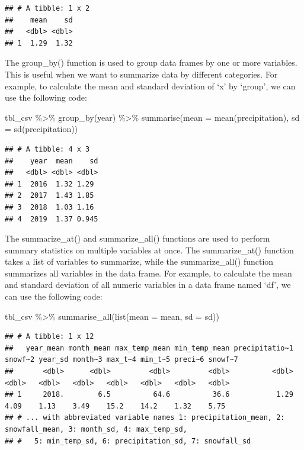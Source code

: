\documentclass[
]{book}
\newenvironment{Shaded}{\begin{snugshade}}{\end{snugshade}}
\newcommand{\AttributeTok}[1]{\textcolor[rgb]{0.77,0.63,0.00}{#1}}
\newcommand{\FunctionTok}[1]{\textcolor[rgb]{0.00,0.00,0.00}{#1}}
\newcommand{\NormalTok}[1]{#1}
\newcommand{\SpecialCharTok}[1]{\textcolor[rgb]{0.00,0.00,0.00}{#1}}
\begin{document}
\begin{verbatim}
## # A tibble: 1 x 2
##    mean    sd
##   <dbl> <dbl>
## 1  1.29  1.32
\end{verbatim}

The group\_by() function is used to group data frames by one or more variables. This is useful when we want to summarize data by different categories. For example, to calculate the mean and standard deviation of `x' by `group', we can use the following code:

\begin{Shaded}
\begin{Highlighting}[]
\NormalTok{tbl\_csv }\SpecialCharTok{\%\textgreater{}\%}
  \FunctionTok{group\_by}\NormalTok{(year) }\SpecialCharTok{\%\textgreater{}\%}
  \FunctionTok{summarise}\NormalTok{(}\AttributeTok{mean =} \FunctionTok{mean}\NormalTok{(precipitation), }
            \AttributeTok{sd =} \FunctionTok{sd}\NormalTok{(precipitation))}
\end{Highlighting}
\end{Shaded}

\begin{verbatim}
## # A tibble: 4 x 3
##    year  mean    sd
##   <dbl> <dbl> <dbl>
## 1  2016  1.32 1.29 
## 2  2017  1.43 1.85 
## 3  2018  1.03 1.16 
## 4  2019  1.37 0.945
\end{verbatim}

The summarize\_at() and summarize\_all() functions are used to perform summary statistics on multiple variables at once. The summarize\_at() function takes a list of variables to summarize, while the summarize\_all() function summarizes all variables in the data frame. For example, to calculate the mean and standard deviation of all numeric variables in a data frame named `df', we can use the following code:

\begin{Shaded}
\begin{Highlighting}[]
\NormalTok{tbl\_csv }\SpecialCharTok{\%\textgreater{}\%}
  \FunctionTok{summarise\_all}\NormalTok{(}\FunctionTok{list}\NormalTok{(}\AttributeTok{mean =}\NormalTok{ mean, }\AttributeTok{sd =}\NormalTok{ sd))}
\end{Highlighting}
\end{Shaded}

\begin{verbatim}
## # A tibble: 1 x 12
##   year_mean month_mean max_temp_mean min_temp_mean precipitatio~1 snowf~2 year_sd month~3 max_t~4 min_t~5 preci~6 snowf~7
##       <dbl>      <dbl>         <dbl>         <dbl>          <dbl>   <dbl>   <dbl>   <dbl>   <dbl>   <dbl>   <dbl>   <dbl>
## 1     2018.        6.5          64.6          36.6           1.29    4.09    1.13    3.49    15.2    14.2    1.32    5.75
## # ... with abbreviated variable names 1: precipitation_mean, 2: snowfall_mean, 3: month_sd, 4: max_temp_sd,
## #   5: min_temp_sd, 6: precipitation_sd, 7: snowfall_sd
\end{verbatim}
\end{document}
